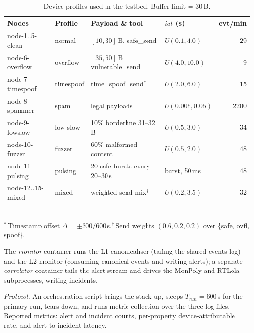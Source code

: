 \documentclass[runningheads]{llncs}
\begin{document}
\begin{table}[t]
\centering
\caption{Device profiles used in the testbed.  Buffer limit = 30\,B.}
\label{tab:profiles}
\renewcommand{\arraystretch}{1.1}
\setlength{\tabcolsep}{3pt}
\footnotesize
\begin{tabular}{@{}l l l l r@{}}
\toprule
\textbf{Nodes} & \textbf{Profile} & \textbf{Payload \& tool} & \textbf{$i\!a\!t$ (s)} & \textbf{evt/min} \\
\midrule
node-1..5-clean   & normal    & $[10,30]$\,B, \textsf{safe\_send}              & $U(0.1, 4.0)$   &   29 \\
node-6-overflow   & overflow  & $[35,60]$\,B \textsf{vulnerable\_send}   & $U(4.0, 10.0)$   &   9 \\
node-7-timespoof  & timespoof & \textsf{time\_spoof\_send}$^{*}$ & $U(2.0, 6.0)$   &   15 \\
node-8-spammer    & spam      & legal payloads                                  & $U(0.005,0.05)$ & 2200 \\
node-9-lowslow    & low-slow   & 10\% borderline 31--32\,B                       & $U(0.5, 3.0)$   &   34 \\
node-10-fuzzer    & fuzzer    & 60\% malformed content                & $U(0.5, 2.0)$   &   48 \\
node-11-pulsing   & pulsing   & 20-safe bursts every 20--30\,s                  & burst, 50\,ms   &   48 \\
node-12..15-mixed & mixed     & weighted send mix$^{\dagger}$    & $U(0.2, 3.5)$   &   32 \\
\bottomrule
\end{tabular}
\\[2pt]
{\footnotesize $^{*}$\,Timestamp offset $\Delta{=}{\pm}300/600$\,s.\quad $^{\dagger}$\,Send weights $(0.6,0.2,0.2)$ over \{safe, ovfl, spoof\}.}
\end{table}


The \emph{monitor} container runs the L1 canonicaliser (tailing the shared events log) and the L2 monitor (consuming canonical events and writing alerts); a separate \emph{correlator} container tails the alert stream and drives the MonPoly and RTLola subprocesses, writing incidents.

\emph{Protocol.}
An orchestration script brings the stack up, sleeps
$T_{\mathit{run}}{=}600$\,s for the primary run, tears down,
and runs metric-collection over the three log files.  Reported
metrics: alert and incident counts, per-property device-attributable
rate, and alert-to-incident latency.
\end{document}
